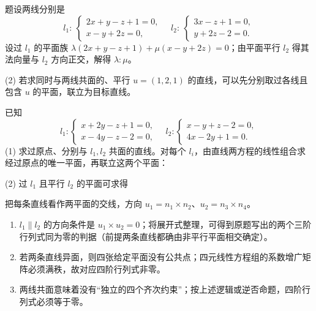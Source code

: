 题设两线分别是
\[
 l_1:\ \begin{cases}2x+y-z+1=0,\\x-y+2z=0,\end{cases}\quad
 l_2:\ \begin{cases}3x-z+1=0,\\y+2z-2=0.\end{cases}
\]
设过 $l_1$ 的平面族 $\lambda(2x+y-z+1)+\mu(x-y+2z)=0$；由平面平行 $l_2$ 得其法向量与 $l_2$ 方向正交，解得 $\lambda:\mu$。

(2) 若求同时与两线共面的、平行 $u=(1,2,1)$ 的直线，可以先分别取过各线且包含 $u$ 的平面，联立为目标直线。

已知
\[l_1:\begin{cases}x+2y-z+1=0,\\x-4y-z-2=0,\end{cases}\quad
l_2:\begin{cases}x-y+z-2=0,\\4x-2y+1=0.\end{cases}\]
(1) 求过原点、分别与 $l_1,l_2$ 共面的直线。对每个 $l_i$，由直线两方程的线性组合求经过原点的唯一平面，再联立这两个平面：

(2) 过 $l_1$ 且平行 $l_2$ 的平面可求得

把每条直线看作两平面的交线，方向 $u_1=n_1\times n_2$、$u_2=n_3\times n_4$。
\begin{enumerate}[label=(\arabic*)]
\item $l_1\parallel l_2$ 的方向条件是 $u_1\times u_2=0$；将展开式整理，可得到原题写出的两个三阶行列式同为零的判据（前提两条直线都确由非平行平面相交确定）。
\item 若两条直线异面，则四张给定平面没有公共点；四元线性方程组的系数增广矩阵必须满秩，故对应四阶行列式非零。
\item 两线共面意味着没有“独立的四个齐次约束”；按上述逻辑或逆否命题，四阶行列式必须等于零。
\end{enumerate}

